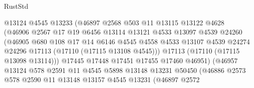 \begin{lexlean}{RustStd}
\begin{coremodule}
                              @13124
                              @4545
                              @13233
                              (@46897
                                @2568
                                @503
                                @11
                                @13115
                                @13122
                                @4628
                                (@46906
                                  @2567
                                  @17
                                  @19
                                  @6456
                                  @13114
                                  @13121
                                  @4533
                                  @13097
                                  @4539
                                  @24260
                                  (@46905
                                    @680
                                    @108
                                    @17
                                    @14
                                    @6146
                                    @4545
                                    @4558
                                    @4533
                                    @13107
                                    @4539
                                    @24274
                                    @24296
                                    @17113
                                    (@17110 (@17115 @13108 @4545)))
                                  @17113
                                  (@17110 (@17115 @13098 @13114)))
                                @17445
                                @17448
                                @17451
                                @17455
                                @17460
                                @46951)
                              (@46957
                                @13124
                                @578
                                @2591
                                @11
                                @4545
                                @5898
                                @13148
                                @13231
                                @50450
                                (@46886
                                  @2573
                                  @578
                                  @2590
                                  @11
                                  @13148
                                  @13157
                                  @4545
                                  @13231
                                  (@46897
                                    @2572

\end{coremodule}
\end{lexlean}
